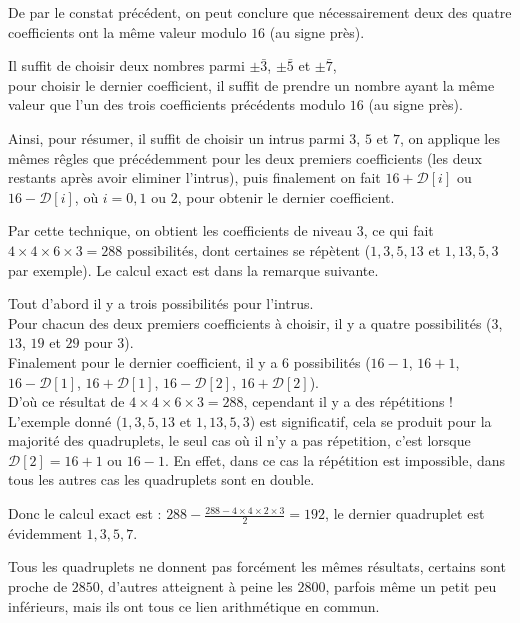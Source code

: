 \documentclass[12pt, a4paper]{memoir}
\begin{document}
  De par le constat précédent, on peut conclure que nécessairement deux des quatre coefficients ont la même 
  valeur modulo $16$ (au signe près).
  
  Il suffit de choisir deux nombres parmi $\pm \bar{3}$, $\pm \bar{5}$ et $\pm \bar{7}$, \\
  pour choisir le dernier coefficient, il suffit de prendre un nombre ayant la même valeur que l'un des 
  trois coefficients précédents modulo $16$ (au signe près).
  
  Ainsi, pour résumer, il suffit de choisir un intrus parmi $3$, $5$ et $7$, on applique les mêmes rêgles
  que précédemment pour les deux premiers coefficients (les deux restants après avoir eliminer l'intrus),
  puis finalement on fait $16 + \mathcal{D}[i]$ ou $16 - \mathcal{D}[i]$, où $i = 0, 1$ ou $2$, pour obtenir
  le dernier coefficient.
  
  Par cette technique, on obtient les coefficients de niveau $3$, ce qui fait $4 \times 4 \times 6 \times 3 = 288$
  possibilités, dont certaines se répètent ($1,3,5,13$ et $1,13,5,3$ par exemple). Le calcul exact est dans la remarque suivante.
  
  \begin{Remarque}
   Tout d'abord il y a trois possibilités pour l'intrus. \\
   Pour chacun des deux premiers coefficients à choisir, il y a quatre possibilités ($3$, $13$, $19$ et $29$
   pour $3$). \\
   Finalement pour le dernier coefficient, il y a $6$ possibilités ($16 - 1$, $16 + 1$,
   $16 - \mathcal{D}[1]$, $16 + \mathcal{D}[1]$, $16 - \mathcal{D}[2]$, $16 + \mathcal{D}[2]$). \\
   D'où ce résultat de $4 \times 4 \times 6 \times 3 = 288$, cependant il y a des répétitions ! \\
   L'exemple donné ($1,3,5,13$ et $1,13,5,3$) est significatif, cela se produit pour la majorité des
   quadruplets, le seul cas où il n'y a pas répetition, c'est lorsque $\mathcal{D}[2] = 16 + 1$ ou $16 - 1$.
   En effet, dans ce cas la répétition est impossible, dans tous les autres cas les quadruplets sont en double.
   
   Donc le calcul exact est : $288 - \frac{288 - 4 \times 4 \times 2 \times 3}{2} = 192$, le dernier quadruplet est 
   évidemment $1,3,5,7$.
  \end{Remarque}

  \begin{Remarque}
   Tous les quadruplets ne donnent pas forcément les mêmes résultats, certains sont proche de $2850$, d'autres
   atteignent à peine les $2800$, parfois même un petit peu inférieurs, mais ils ont tous ce lien arithmétique
   en commun.
  \end{Remarque}
\end{document}
